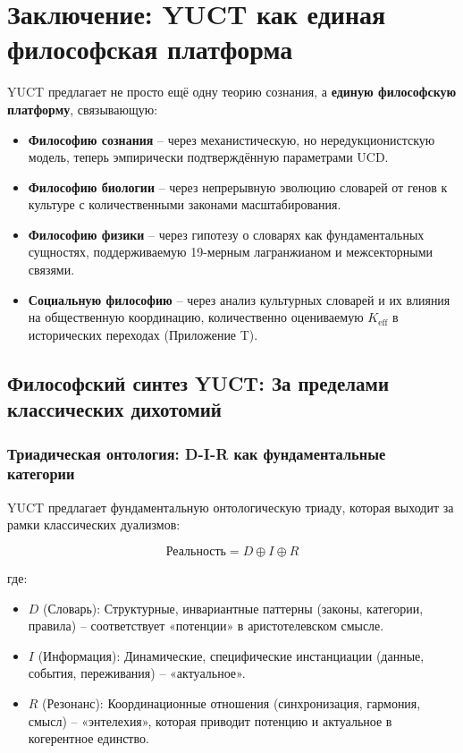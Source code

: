 \documentclass[12pt,a4paper]{article}
\newcommand{\eff}{\mathrm{eff}}
\newcommand{\Ke}{K_{\eff}}
\begin{document}
	\section{Заключение: YUCT как единая философская платформа}
	
	YUCT предлагает не просто ещё одну теорию сознания, а \textbf{единую философскую платформу}, связывающую:
	\begin{itemize}
		\item \textbf{Философию сознания} – через механистическую, но нередукционистскую модель, теперь эмпирически подтверждённую параметрами UCD.
		\item \textbf{Философию биологии} – через непрерывную эволюцию словарей от генов к культуре с количественными законами масштабирования.
		\item \textbf{Философию физики} – через гипотезу о словарях как фундаментальных сущностях, поддерживаемую 19-мерным лагранжианом и межсекторными связями.
		\item \textbf{Социальную философию} – через анализ культурных словарей и их влияния на общественную координацию, количественно оцениваемую $\Ke$ в исторических переходах (Приложение T).
	\end{itemize}
	
	\subsection{Философский синтез YUCT: За пределами классических дихотомий}
	
	\subsubsection{Триадическая онтология: D-I-R как фундаментальные категории}
	
	YUCT предлагает фундаментальную онтологическую триаду, которая выходит за рамки классических дуализмов:
	
	\[
	\text{Реальность} = D \oplus I \oplus R
	\]
	
	где:
	\begin{itemize}
		\item $D$ (Словарь): Структурные, инвариантные паттерны (законы, категории, правила) – соответствует «потенции» в аристотелевском смысле.
		\item $I$ (Информация): Динамические, специфические инстанциации (данные, события, переживания) – «актуальное».
		\item $R$ (Резонанс): Координационные отношения (синхронизация, гармония, смысл) – «энтелехия», которая приводит потенцию и актуальное в когерентное единство.
	\end{itemize}
	
\end{document}
